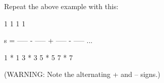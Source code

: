 Repeat the above example with this:

\begin{console}

      1       1       1       1

s = ----- - ----- + ----- - ----- ...

    1 * 1   3 * 3   5 * 5   7 * 7

\end{console}

(WARNING: Note the alternating + and -- signs.)


